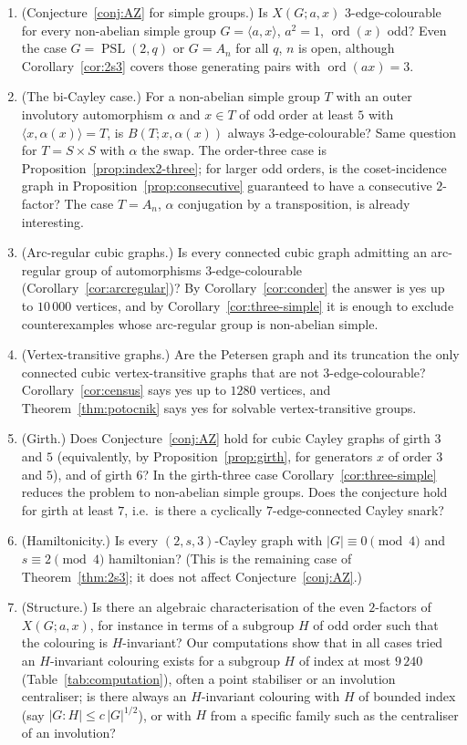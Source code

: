 \documentclass[11pt,a4paper]{article}
\theoremstyle{definition}
\theoremstyle{remark}
\newcommand{\ord}{\operatorname{ord}}
\newcommand{\PSL}{\operatorname{PSL}}
\newcommand{\X}[3]{X(#1;#2,#3)}
\begin{document}
\begin{enumerate}[leftmargin=2em]
\item (Conjecture~\ref{conj:AZ} for simple groups.)  Is $\X{G}{a}{x}$ $3$-edge-colourable for every non-abelian simple group $G=\langle a,x\rangle$, $a^2=1$, $\ord(x)$ odd?  Even the case $G=\PSL(2,q)$ or $G=A_n$ for all $q$, $n$ is open, although Corollary~\ref{cor:2s3} covers those generating pairs with $\ord(ax)=3$.
\item (The bi-Cayley case.)  For a non-abelian simple group $T$ with an outer involutory automorphism $\alpha$ and $x\in T$ of odd order at least $5$ with $\langle x,\alpha(x)\rangle=T$, is $B(T;x,\alpha(x))$ always $3$-edge-colourable?  Same question for $T=S\times S$ with $\alpha$ the swap.  The order-three case is Proposition~\ref{prop:index2-three}; for larger odd orders, is the coset-incidence graph in Proposition~\ref{prop:consecutive} guaranteed to have a consecutive $2$-factor?  The case $T=A_n$, $\alpha$ conjugation by a transposition, is already interesting.
\item (Arc-regular cubic graphs.)  Is every connected cubic graph admitting an arc-regular group of automorphisms $3$-edge-colourable (Corollary~\ref{cor:arcregular})?  By Corollary~\ref{cor:conder} the answer is yes up to $10\,000$ vertices, and by Corollary~\ref{cor:three-simple} it is enough to exclude counterexamples whose arc-regular group is non-abelian simple.
\item (Vertex-transitive graphs.)  Are the Petersen graph and its truncation the only connected cubic vertex-transitive graphs that are not $3$-edge-colourable?  Corollary~\ref{cor:census} says yes up to $1280$ vertices, and Theorem~\ref{thm:potocnik} says yes for solvable vertex-transitive groups.
\item (Girth.)  Does Conjecture~\ref{conj:AZ} hold for cubic Cayley graphs of girth $3$ and $5$ (equivalently, by Proposition~\ref{prop:girth}, for generators $x$ of order $3$ and $5$), and of girth $6$?  In the girth-three case Corollary~\ref{cor:three-simple} reduces the problem to non-abelian simple groups.  Does the conjecture hold for girth at least $7$, i.e.\ is there a cyclically $7$-edge-connected Cayley snark?
\item (Hamiltonicity.)  Is every $(2,s,3)$-Cayley graph with $|G|\equiv0\pmod 4$ and $s\equiv2\pmod4$ hamiltonian?  (This is the remaining case of Theorem~\ref{thm:2s3}; it does not affect Conjecture~\ref{conj:AZ}.)
\item (Structure.)  Is there an algebraic characterisation of the even $2$-factors of $\X{G}{a}{x}$, for instance in terms of a subgroup $H$ of odd order such that the colouring is $H$-invariant?  Our computations show that in all cases tried an $H$-invariant colouring exists for a subgroup $H$ of index at most $9\,240$ (Table~\ref{tab:computation}), often a point stabiliser or an involution centraliser; is there always an $H$-invariant colouring with $H$ of bounded index (say $|G:H|\le c\,|G|^{1/2}$), or with $H$ from a specific family such as the centraliser of an involution?

\end{enumerate}
\end{document}
